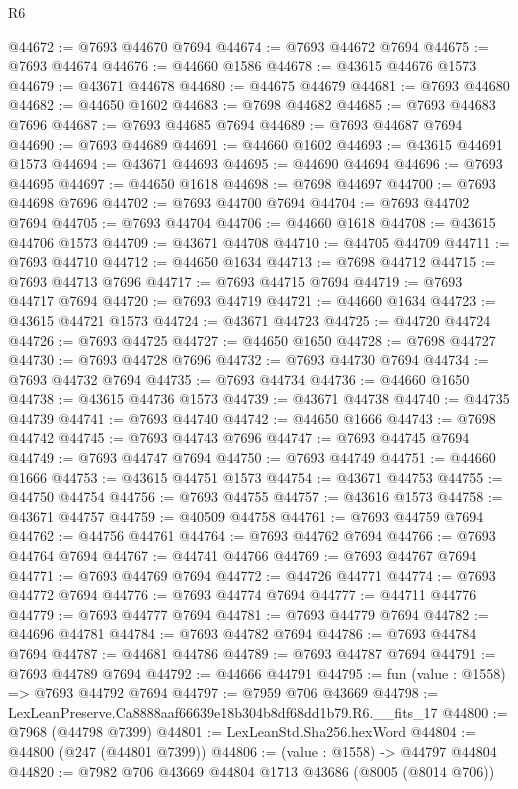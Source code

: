 \begin{lexlean}{R6}
\begin{coremodule}
@44672 := @7693 @44670 @7694
@44674 := @7693 @44672 @7694
@44675 := @7693 @44674
@44676 := @44660 @1586
@44678 := @43615 @44676 @1573
@44679 := @43671 @44678
@44680 := @44675 @44679
@44681 := @7693 @44680
@44682 := @44650 @1602
@44683 := @7698 @44682
@44685 := @7693 @44683 @7696
@44687 := @7693 @44685 @7694
@44689 := @7693 @44687 @7694
@44690 := @7693 @44689
@44691 := @44660 @1602
@44693 := @43615 @44691 @1573
@44694 := @43671 @44693
@44695 := @44690 @44694
@44696 := @7693 @44695
@44697 := @44650 @1618
@44698 := @7698 @44697
@44700 := @7693 @44698 @7696
@44702 := @7693 @44700 @7694
@44704 := @7693 @44702 @7694
@44705 := @7693 @44704
@44706 := @44660 @1618
@44708 := @43615 @44706 @1573
@44709 := @43671 @44708
@44710 := @44705 @44709
@44711 := @7693 @44710
@44712 := @44650 @1634
@44713 := @7698 @44712
@44715 := @7693 @44713 @7696
@44717 := @7693 @44715 @7694
@44719 := @7693 @44717 @7694
@44720 := @7693 @44719
@44721 := @44660 @1634
@44723 := @43615 @44721 @1573
@44724 := @43671 @44723
@44725 := @44720 @44724
@44726 := @7693 @44725
@44727 := @44650 @1650
@44728 := @7698 @44727
@44730 := @7693 @44728 @7696
@44732 := @7693 @44730 @7694
@44734 := @7693 @44732 @7694
@44735 := @7693 @44734
@44736 := @44660 @1650
@44738 := @43615 @44736 @1573
@44739 := @43671 @44738
@44740 := @44735 @44739
@44741 := @7693 @44740
@44742 := @44650 @1666
@44743 := @7698 @44742
@44745 := @7693 @44743 @7696
@44747 := @7693 @44745 @7694
@44749 := @7693 @44747 @7694
@44750 := @7693 @44749
@44751 := @44660 @1666
@44753 := @43615 @44751 @1573
@44754 := @43671 @44753
@44755 := @44750 @44754
@44756 := @7693 @44755
@44757 := @43616 @1573
@44758 := @43671 @44757
@44759 := @40509 @44758
@44761 := @7693 @44759 @7694
@44762 := @44756 @44761
@44764 := @7693 @44762 @7694
@44766 := @7693 @44764 @7694
@44767 := @44741 @44766
@44769 := @7693 @44767 @7694
@44771 := @7693 @44769 @7694
@44772 := @44726 @44771
@44774 := @7693 @44772 @7694
@44776 := @7693 @44774 @7694
@44777 := @44711 @44776
@44779 := @7693 @44777 @7694
@44781 := @7693 @44779 @7694
@44782 := @44696 @44781
@44784 := @7693 @44782 @7694
@44786 := @7693 @44784 @7694
@44787 := @44681 @44786
@44789 := @7693 @44787 @7694
@44791 := @7693 @44789 @7694
@44792 := @44666 @44791
@44795 := fun (value : @1558) => @7693 @44792 @7694
@44797 := @7959 @706 @43669
@44798 := LexLeanPreserve.Ca8888aaf66639e18b304b8df68dd1b79.R6.__fits_17
@44800 := @7968 (@44798 @7399)
@44801 := LexLeanStd.Sha256.hexWord
@44804 := @44800 (@247 (@44801 @7399))
@44806 := (value : @1558) -> @44797 @44804
@44820 := @7982
    @706
    @43669
    @44804
    @1713
    @43686
    (@8005 (@8014 @706))

\end{coremodule}
\end{lexlean}
